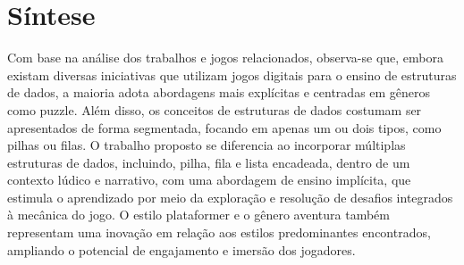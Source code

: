 \section{Síntese}

Com base na análise dos trabalhos e jogos relacionados, observa-se que, embora existam diversas iniciativas que utilizam jogos digitais para o ensino de estruturas de dados, a maioria adota abordagens mais explícitas e centradas em gêneros como puzzle.
Além disso, os conceitos de estruturas de dados costumam ser apresentados de forma segmentada, focando em apenas um ou dois tipos, como pilhas ou filas.
O trabalho proposto se diferencia ao incorporar múltiplas estruturas de dados, incluindo, pilha, fila e lista encadeada, dentro de um contexto lúdico e narrativo, com uma abordagem de ensino implícita, que estimula o aprendizado por meio da exploração e resolução de desafios integrados à mecânica do jogo.
O estilo plataformer e o gênero aventura também representam uma inovação em relação aos estilos predominantes encontrados, ampliando o potencial de engajamento e imersão dos jogadores.

